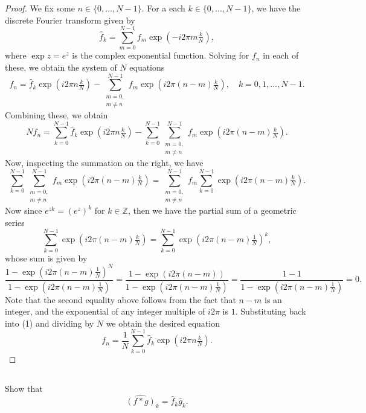 \documentclass[12pt]{article}
\newenvironment{problem}
    {\begin{lrbox}{\mybox}\begin{minipage}{0.98\textwidth}}
    {\end{minipage}\end{lrbox}\framebox[\textwidth]{\usebox{\mybox}}}
\newcommand{\Z}{\mathbb{Z}}
\newcommand{\<}{\left\langle}
\renewcommand{\>}{\right\rangle}
\newcommand{\expp}[1]{\exp\!\left( #1 \right)}
\begin{document}
\begin{proof}
    We fix some $n \in \{0, \dots, N-1\}$. For a each $k \in \{0, \dots, N-1\}$, we have the discrete Fourier transform given by
    \[
        \widehat{f}_k = \sum_{m=0}^{N-1} f_m \expp{-i2\pi m \tfrac{k}{N}},
    \]
    where $\exp z = e^z$ is the complex exponential function. Solving for $f_n$ in each of these, we obtain the system of $N$ equations
    \[
        f_n = \widehat{f}_k\expp{i2\pi n \tfrac{k}{N}}
            - \sum_{\substack{m=0, \\ m \ne n}}^{N-1} f_m \expp{i2\pi (n-m) \tfrac{k}{N}},
            \quad k = 0, 1, \dots, N-1.
    \]
    Combining these, we obtain
    \[
        Nf_n = \sum_{k=0}^{N-1}\widehat{f}_k \expp{i2\pi n \tfrac{k}{N}}
            - \sum_{k=0}^{N-1}\sum_{\substack{m=0, \\ m \ne n}}^{N-1} f_m \expp{i2\pi (n-m) \tfrac{k}{N}}.
        \tag{1}
    \]
    Now, inspecting the summation on the right, we have
    \[
        \sum_{k=0}^{N-1}\sum_{\substack{m=0, \\ m \ne n}}^{N-1} f_m \expp{i2\pi (n-m) \tfrac{k}{N}}
            = \sum_{\substack{m=0, \\ m \ne n}}^{N-1} f_m \sum_{k=0}^{N-1} \expp{i2\pi (n-m) \tfrac{k}{N}}.
    \]
    Now since $e^{zk} = \left(e^z\right)^k$ for $k \in \Z$, then we have the partial sum of a geometric series
    \[
        \sum_{k=0}^{N-1} \expp{i2\pi (n-m) \tfrac{k}{N}}
            = \sum_{k=0}^{N-1} \expp{i2\pi (n-m) \tfrac{1}{N}}^k,
    \]
    whose sum is given by
    \[
        \frac{1 - \expp{i2\pi (n-m) \tfrac{1}{N}}^N}{1 - \expp{i2\pi (n-m) \tfrac{1}{N}}}
            = \frac{1 - \expp{i2\pi (n-m)}}{1 - \expp{i2\pi (n-m) \tfrac{1}{N}}}
            = \frac{1 - 1}{1 - \expp{i2\pi (n-m) \tfrac{1}{N}}}
            = 0.
    \]
    Note that the second equality above follows from the fact that $n-m$ is an integer, and the exponential of any integer multiple of $i2\pi$ is $1$. Substituting back into (1) and dividing by $N$ we obtain the desired equation
    \[
        f_n = \frac1N \sum_{k=0}^{N-1}\widehat{f}_k \expp{i2\pi n \tfrac{k}{N}}.
    \]

\end{proof}

\subsection{}
\begin{problem}
    Show that
    \[
        \widehat{(f * g)}_k = \widehat{f}_k \widehat{g}_k.
    \]
\end{problem}
\end{document}
